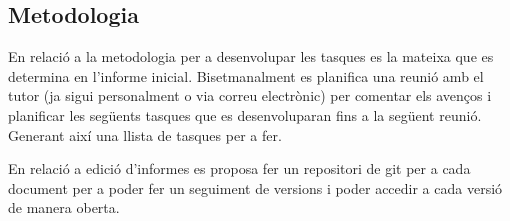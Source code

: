 \documentclass[conference,onecolumn, catalan]{IEEEtran}
\begin{document}


\subsection{Metodologia}

En relació a la metodologia per a desenvolupar les tasques es la mateixa que es determina en l'informe inicial. Bisetmanalment es planifica una reunió amb el tutor (ja sigui personalment o via correu electrònic) per comentar els avenços i planificar les següents tasques que es desenvoluparan fins a la següent reunió. Generant així una llista de tasques per a fer.

En relació a edició d'informes es proposa fer un repositori de git per a cada document per a poder fer un seguiment de versions i poder accedir a cada versió de manera oberta.








\end{document}
